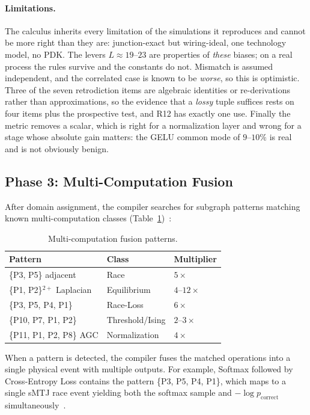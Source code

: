 \documentclass[11pt]{article}
\begin{document}
\paragraph{Limitations.} The calculus inherits every limitation of the simulations it reproduces and cannot be more right than they are: junction-exact but wiring-ideal, one technology model, no PDK. The levers $L\approx19$--$23$ are properties of \textit{these} biases; on a real process the rules survive and the constants do not. Mismatch is assumed independent, and the correlated case is known to be \textit{worse}, so this is optimistic. Three of the seven retrodiction items are algebraic identities or re-derivations rather than approximations, so the evidence that a \textit{lossy} tuple suffices rests on four items plus the prospective test, and R12 has exactly one use. Finally the metric removes a scalar, which is right for a normalization layer and wrong for a stage whose absolute gain matters: the GELU common mode of $9$--$10\%$ is real and is not obviously benign.

\subsection{Phase 3: Multi-Computation Fusion}

After domain assignment, the compiler searches for subgraph patterns matching known multi-computation classes (Table~\ref{tab:fusion})~\cite{bieg2026}:

\begin{table}[h]
\centering
\caption{Multi-computation fusion patterns.}
\label{tab:fusion}
\small
\begin{tabular}{lll}
\toprule
Pattern & Class & Multiplier \\
\midrule
\{P3, P5\} adjacent & Race & $5\times$ \\
\{P1, P2\}$^{2+}$ Laplacian & Equilibrium & $4$--$12\times$ \\
\{P3, P5, P4, P1\} & Race-Loss & $6\times$ \\
\{P10, P7, P1, P2\} & Threshold/Ising & $2$--$3\times$ \\
\{P11, P1, P2, P8\} AGC & Normalization & $4\times$ \\
\bottomrule
\end{tabular}
\end{table}

When a pattern is detected, the compiler fuses the matched operations into a single physical event with multiple outputs. For example, Softmax followed by Cross-Entropy Loss contains the pattern \{P3, P5, P4, P1\}, which maps to a single sMTJ race event yielding both the softmax sample and $-\log p_{\text{correct}}$ simultaneously~\cite{bieg2026}.
\end{document}
